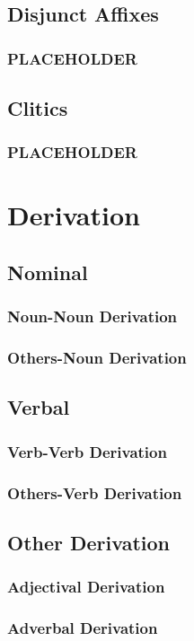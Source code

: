 \documentclass[a4paper, 12pt, oneside]{memoir}
\begin{document}
\section{Disjunct Affixes}
\subsection{PLACEHOLDER}
\section{Clitics}
\subsection{PLACEHOLDER}
\chapter{Derivation}
\section{Nominal}
\subsection{Noun-Noun Derivation}
\subsection{Others-Noun Derivation}
\section{Verbal}
\subsection{Verb-Verb Derivation}
\subsection{Others-Verb Derivation}
\section{Other Derivation}
\subsection{Adjectival Derivation}
\subsection{Adverbal Derivation}
\end{document}
